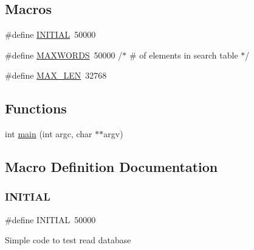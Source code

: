 \subsection*{Macros}
\begin{DoxyCompactItemize}
\item 
\#define \mbox{\hyperlink{adat-devel_2other__libs_2filedb_2filehash_2tkeyseq_8c_aa3d063564f6ab16f6d408b8369d0e9ff}{I\+N\+I\+T\+I\+AL}}~50000
\item 
\#define \mbox{\hyperlink{adat-devel_2other__libs_2filedb_2filehash_2tkeyseq_8c_aa6b319146daf33409da1bbe4194553dc}{M\+A\+X\+W\+O\+R\+DS}}~50000	       /$\ast$ \# of elements in search table $\ast$/
\item 
\#define \mbox{\hyperlink{adat-devel_2other__libs_2filedb_2filehash_2tkeyseq_8c_aabf4f709c8199e41cf279c77112345fe}{M\+A\+X\+\_\+\+L\+EN}}~32768
\end{DoxyCompactItemize}
\subsection*{Functions}
\begin{DoxyCompactItemize}
\item 
int \mbox{\hyperlink{adat-devel_2other__libs_2filedb_2filehash_2tkeyseq_8c_a3c04138a5bfe5d72780bb7e82a18e627}{main}} (int argc, char $\ast$$\ast$argv)
\end{DoxyCompactItemize}


\subsection{Macro Definition Documentation}
\mbox{\label{adat-devel_2other__libs_2filedb_2filehash_2tkeyseq_8c_aa3d063564f6ab16f6d408b8369d0e9ff}} 
\subsubsection{\texorpdfstring{INITIAL}{INITIAL}}
{\footnotesize\ttfamily \#define I\+N\+I\+T\+I\+AL~50000}

Simple code to test read database \mbox{\label{adat-devel_2other__libs_2filedb_2filehash_2tkeyseq_8c_aabf4f709c8199e41cf279c77112345fe}} 
